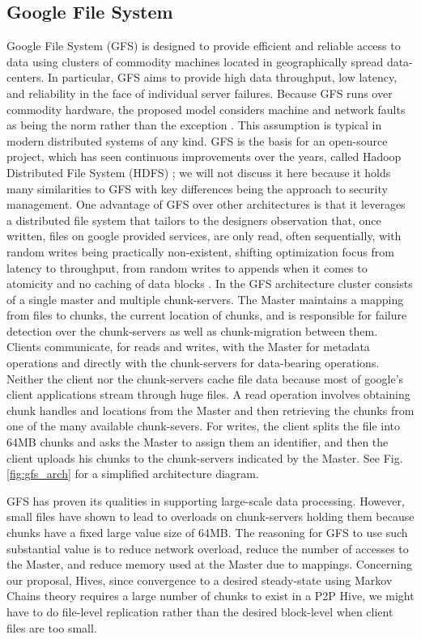 \documentclass[runningheads]{llncs}
\begin{document}
\subsection{Google File System}

Google File System (GFS) \cite{gfs} is designed to provide efficient and reliable access to data using clusters of commodity machines located in geographically spread data-centers. In particular, GFS aims to provide high data throughput, low latency, and reliability in the face of individual server failures. Because GFS runs over commodity hardware, the proposed model considers machine and network faults as being the norm rather than the exception \cite{gfs}.  This assumption is typical in modern distributed systems of any kind. GFS is the basis for an open-source project, which has seen continuous improvements over the years, called Hadoop Distributed File System (HDFS) \cite{hadoop}; we will not discuss it here because it holds many similarities to GFS with key differences being the approach to security management. One advantage of GFS over other architectures is that it leverages a distributed file system that tailors to the designers observation that, once written, files on google provided services, are only read, often sequentially, with random writes being practically non-existent, shifting optimization focus from latency to throughput, from random writes to appends when it comes to atomicity and no caching of data blocks \cite{gfs}. In the GFS architecture cluster consists of a single master and multiple chunk-servers. The Master maintains a mapping from files to chunks, the current location of chunks, and is responsible for failure detection over the chunk-servers as well as chunk-migration between them. Clients communicate, for reads and writes, with the Master for metadata operations and directly with the chunk-servers for data-bearing operations. Neither the client nor the chunk-servers cache file data because most of google's client applications stream through huge files. A read operation involves obtaining chunk handles and locations from the Master and then retrieving the chunks from one of the many available chunk-severs. For writes, the client splits the file into 64MB chunks and asks the Master to assign them an identifier, and then the client uploads his chunks to the chunk-servers indicated by the Master. See Fig.\ref{fig:gfs_arch} for a simplified architecture diagram.

GFS has proven its qualities in supporting large-scale data processing. However, small files have shown \cite{gfs} to lead to overloads on chunk-servers holding them because chunks have a fixed large value size of 64MB. The reasoning for GFS to use such substantial value is to reduce network overload, reduce the number of accesses to the Master, and reduce memory used at the Master due to mappings. Concerning our proposal, Hives, since convergence to a desired steady-state using Markov Chains theory requires a large number of chunks to exist in a P2P Hive, we might have to do file-level replication rather than the desired block-level when client files are too small.\newline
\end{document}
